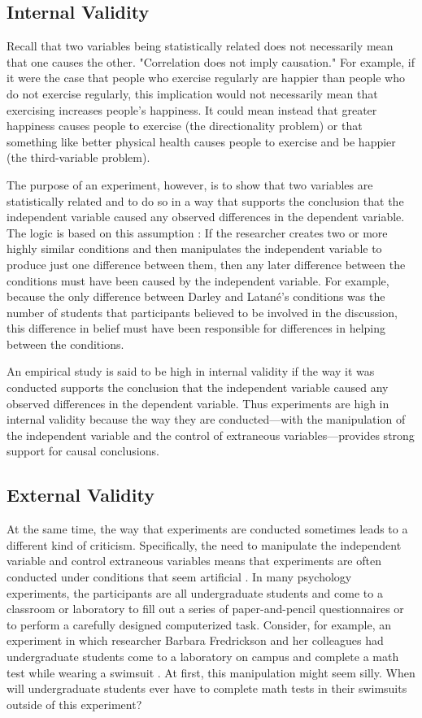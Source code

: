  \subsection{Internal Validity}

 Recall that two variables being statistically related does not necessarily mean that one causes the other. "Correlation does not imply causation." For example, if it were the case that people who exercise regularly are happier than people who do not exercise regularly, this implication would not necessarily mean that exercising increases people's happiness. It could mean instead that greater happiness causes people to exercise (the directionality problem) or that something like better physical health causes people to exercise and be happier (the third-variable problem).

 The purpose of an experiment, however, is to show that two variables are statistically related and to do so in a way that supports the conclusion that the independent variable caused any observed differences in the dependent variable. The logic is based on this assumption : If the researcher creates two or more highly similar conditions and then manipulates the independent variable to produce just one difference between them, then any later difference between the conditions must have been caused by the independent variable. For example, because the only difference between Darley and Latan\'e's conditions was the number of students that participants believed to be involved in the discussion, this difference in belief must have been responsible for differences in helping between the conditions.

 An empirical study is said to be high in internal validity if the way it was conducted supports the conclusion that the independent variable caused any observed differences in the dependent variable. Thus experiments are high in internal validity because the way they are conducted---with the manipulation of the independent variable and the control of extraneous variables---provides strong support for causal conclusions.

 \subsection{External Validity}

At the same time, the way that experiments are conducted sometimes leads to a different kind of criticism. Specifically, the need to manipulate the independent variable and control extraneous variables means that experiments are often conducted under conditions that seem artificial \citep{bauman_revisiting_2014}. In many psychology experiments, the participants are all undergraduate students and come to a classroom or laboratory to fill out a series of paper-and-pencil questionnaires or to perform a carefully designed computerized task. Consider, for example, an experiment in which researcher Barbara Fredrickson and her colleagues had undergraduate students come to a laboratory on campus and complete a math test while wearing a swimsuit \citep{fredrickson_that_1998}. At first, this manipulation might seem silly. When will undergraduate students ever have to complete math tests in their swimsuits outside of this experiment?

